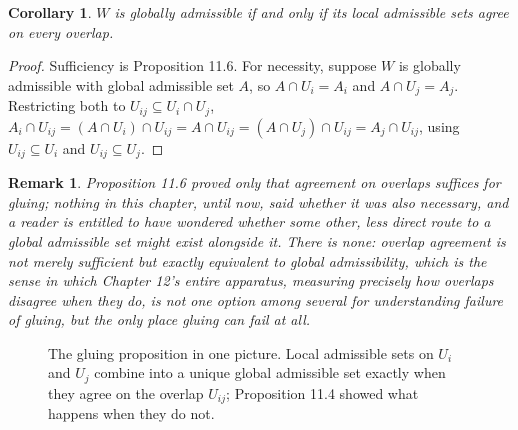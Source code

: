 \documentclass[11pt]{book}
\newtheorem{corollary}[theorem]{Corollary}
\newtheorem{remark}[theorem]{Remark}
\begin{document}
\begin{corollary}
$W$ is globally admissible if and only if its local admissible sets agree on every overlap.
\end{corollary}

\begin{proof}
Sufficiency is Proposition 11.6. For necessity, suppose $W$ is globally admissible with global admissible set $A$, so $A \cap U_i = A_i$ and $A \cap U_j = A_j$. Restricting both to $U_{ij} \subseteq U_i \cap U_j$, $A_i \cap U_{ij} = (A \cap U_i) \cap U_{ij} = A \cap U_{ij} = (A \cap U_j) \cap U_{ij} = A_j \cap U_{ij}$, using $U_{ij} \subseteq U_i$ and $U_{ij} \subseteq U_j$.
\end{proof}

\begin{remark}
Proposition 11.6 proved only that agreement on overlaps suffices for gluing; nothing in this chapter, until now, said whether it was also necessary, and a reader is entitled to have wondered whether some other, less direct route to a global admissible set might exist alongside it. There is none: overlap agreement is not merely sufficient but exactly equivalent to global admissibility, which is the sense in which Chapter 12's entire apparatus, measuring precisely how overlaps disagree when they do, is not one option among several for understanding failure of gluing, but the only place gluing can fail at all.
\end{remark}

\begin{figure}[htb]
\centering
{}
\caption{The gluing proposition in one picture. Local admissible sets on $U_i$ and $U_j$ combine into a unique global admissible set exactly when they agree on the overlap $U_{ij}$; Proposition 11.4 showed what happens when they do not.}
\label{fig:sheaf-gluing}
\end{figure}
\end{document}
